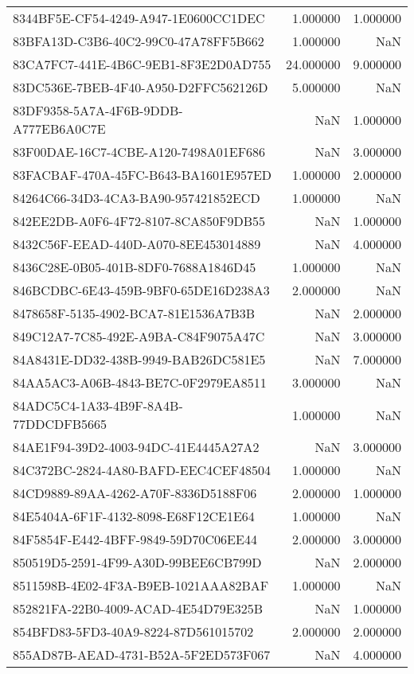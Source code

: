 \begin{tabular}{lrr}
8344BF5E-CF54-4249-A947-1E0600CC1DEC & 1.000000 & 1.000000 \\
83BFA13D-C3B6-40C2-99C0-47A78FF5B662 & 1.000000 & NaN \\
83CA7FC7-441E-4B6C-9EB1-8F3E2D0AD755 & 24.000000 & 9.000000 \\
83DC536E-7BEB-4F40-A950-D2FFC562126D & 5.000000 & NaN \\
83DF9358-5A7A-4F6B-9DDB-A777EB6A0C7E & NaN & 1.000000 \\
83F00DAE-16C7-4CBE-A120-7498A01EF686 & NaN & 3.000000 \\
83FACBAF-470A-45FC-B643-BA1601E957ED & 1.000000 & 2.000000 \\
84264C66-34D3-4CA3-BA90-957421852ECD & 1.000000 & NaN \\
842EE2DB-A0F6-4F72-8107-8CA850F9DB55 & NaN & 1.000000 \\
8432C56F-EEAD-440D-A070-8EE453014889 & NaN & 4.000000 \\
8436C28E-0B05-401B-8DF0-7688A1846D45 & 1.000000 & NaN \\
846BCDBC-6E43-459B-9BF0-65DE16D238A3 & 2.000000 & NaN \\
8478658F-5135-4902-BCA7-81E1536A7B3B & NaN & 2.000000 \\
849C12A7-7C85-492E-A9BA-C84F9075A47C & NaN & 3.000000 \\
84A8431E-DD32-438B-9949-BAB26DC581E5 & NaN & 7.000000 \\
84AA5AC3-A06B-4843-BE7C-0F2979EA8511 & 3.000000 & NaN \\
84ADC5C4-1A33-4B9F-8A4B-77DDCDFB5665 & 1.000000 & NaN \\
84AE1F94-39D2-4003-94DC-41E4445A27A2 & NaN & 3.000000 \\
84C372BC-2824-4A80-BAFD-EEC4CEF48504 & 1.000000 & NaN \\
84CD9889-89AA-4262-A70F-8336D5188F06 & 2.000000 & 1.000000 \\
84E5404A-6F1F-4132-8098-E68F12CE1E64 & 1.000000 & NaN \\
84F5854F-E442-4BFF-9849-59D70C06EE44 & 2.000000 & 3.000000 \\
850519D5-2591-4F99-A30D-99BEE6CB799D & NaN & 2.000000 \\
8511598B-4E02-4F3A-B9EB-1021AAA82BAF & 1.000000 & NaN \\
852821FA-22B0-4009-ACAD-4E54D79E325B & NaN & 1.000000 \\
854BFD83-5FD3-40A9-8224-87D561015702 & 2.000000 & 2.000000 \\
855AD87B-AEAD-4731-B52A-5F2ED573F067 & NaN & 4.000000 \\

\end{tabular}
